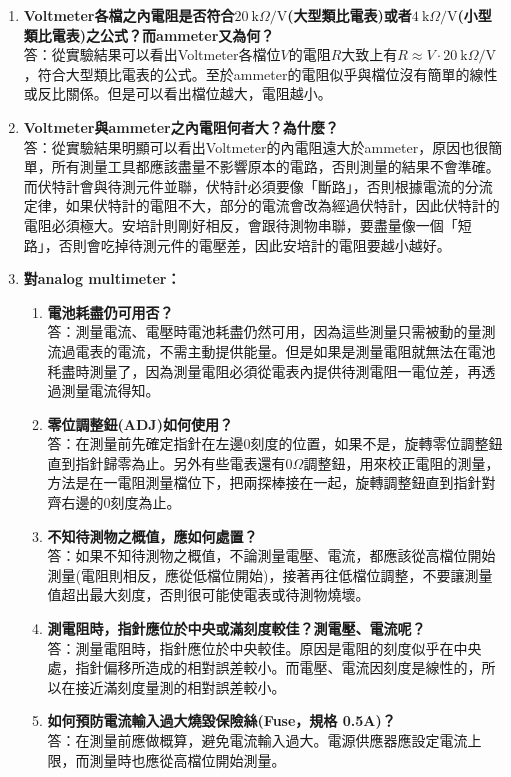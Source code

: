 \documentclass[12pt, a4paper]{article}
\def\large{\fontsize{14}{21}\selectfont}
\begin{document}
\begin{enumerate}[itemsep=20pt, topsep=10pt]
	\item {\large\bf Voltmeter各檔之內電阻是否符合$20\:\text{k}\Omega/\text{V}$(大型類比電表)或者$4\:\text{k}\Omega/\text{V}$(小型類比電表)之公式？而ammeter又為何？} \\[10pt]
		答：從實驗結果可以看出Voltmeter各檔位$V$的電阻$R$大致上有$R \approx V \cdot 20\:\text{k}\Omega/\text{V}$，符合大型類比電表的公式。至於ammeter的電阻似乎與檔位沒有簡單的線性或反比關係。但是可以看出檔位越大，電阻越小。
	\item {\large\bf Voltmeter與ammeter之內電阻何者大？為什麼？}\\[10pt]
		答：從實驗結果明顯可以看出Voltmeter的內電阻遠大於ammeter，原因也很簡單，所有測量工具都應該盡量不影響原本的電路，否則測量的結果不會準確。而伏特計會與待測元件並聯，伏特計必須要像「斷路」，否則根據電流的分流定律，如果伏特計的電阻不大，部分的電流會改為經過伏特計，因此伏特計的電阻必須極大。安培計則剛好相反，會跟待測物串聯，要盡量像一個「短路」，否則會吃掉待測元件的電壓差，因此安培計的電阻要越小越好。
	\item {\large \bf 對analog multimeter：}
		\begin{enumerate}[label=(\alph*)]
			\item {\large\bf 電池耗盡仍可用否？} \\[5pt]
				答：測量電流、電壓時電池耗盡仍然可用，因為這些測量只需被動的量測流過電表的電流，不需主動提供能量。但是如果是測量電阻就無法在電池秏盡時測量了，因為測量電阻必須從電表內提供待測電阻一電位差，再透過測量電流得知。
			\item {\large\bf 零位調整鈕(ADJ)如何使用？}\\[5pt]
				答：在測量前先確定指針在左邊$0$刻度的位置，如果不是，旋轉零位調整鈕直到指針歸零為止。另外有些電表還有$0\Omega$調整鈕，用來校正電阻的測量，方法是在一電阻測量檔位下，把兩探棒接在一起，旋轉調整鈕直到指針對齊右邊的$0$刻度為止。
			\item {\large\bf 不知待測物之概值，應如何處置？} \\[5pt]
				答：如果不知待測物之概值，不論測量電壓、電流，都應該從高檔位開始測量(電阻則相反，應從低檔位開始)，接著再往低檔位調整，不要讓測量值超出最大刻度，否則很可能使電表或待測物燒壞。
			\item {\large\bf 測電阻時，指針應位於中央或滿刻度較佳？測電壓、電流呢？} \\[5pt]
				答：測量電阻時，指針應位於中央較佳。原因是電阻的刻度似乎在中央處，指針偏移所造成的相對誤差較小。而電壓、電流因刻度是線性的，所以在接近滿刻度量測的相對誤差較小。
			\item {\large\bf 如何預防電流輸入過大燒毀保險絲(Fuse，規格 0.5A)？} \\[5pt]
				答：在測量前應做概算，避免電流輸入過大。電源供應器應設定電流上限，而測量時也應從高檔位開始測量。
		\end{enumerate}


\end{enumerate}
\end{document}
